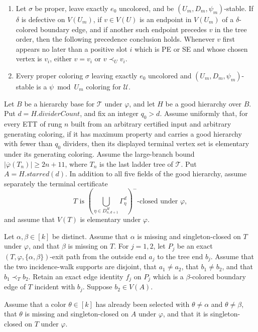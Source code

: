 \begin{lemma}
\begin{enumerate}
$(\gamma_m,\delta_m)$ incidence component through $v$ meets $V(U_m)$
exactly in $v$.
\item Let $\sigma$ be proper, leave exactly $e_0$ uncolored, and be
$(U_m,D_m,\psi_m)$-stable.  If $\delta$ is defective on $V(U_m)$, if
$v\in V(U)$ is an endpoint in $V(U_m)$ of a $\delta$-colored boundary
edge, and if another such endpoint precedes $v$ in the tree order, then
the following precedence conclusion holds.  Whenever $v$ first appears
no later than a positive slot $i$ which is PE or SE and whose chosen
vertex is $v_i$, either $v=v_i$ or $v\prec_U v_i$.
\item Every proper coloring $\sigma$ leaving exactly $e_0$ uncolored and
$(U_m,D_m,\psi_m)$-stable is a $\psi\bmod U_m$ coloring for
$\mathcal U$.
\end{enumerate}

Let $B$ be a hierarchy base for $\mathcal T$ under $\varphi$, and let $H$
be a good hierarchy over $B$.  Put $d=H.\mathit{dividerCount}$, and fix an
integer $q_0>d$.  Assume uniformly that, for every ETT of rung $n$ built
from an arbitrary certified input and arbitrary generating coloring, if it
has maximum property and carries a good hierarchy with fewer than $q_0$
dividers, then its displayed terminal vertex set is elementary under its
generating coloring.  Assume the large-branch bound
$|\overline\varphi(T_n)|\geq2n+11$, where $T_n$ is the last ladder tree of
$\mathcal T$.  Put $A=H.\mathit{starred}(d)$.  In addition to all five
fields of the good hierarchy, assume separately the terminal certificate
\[
 T\text{ is }
 \left(\bigcup_{\eta\in D^H_{n,d+1}}\Gamma^d_\eta\right)^-
 \text{-closed under }\varphi,
\]
and assume that $V(T)$ is elementary under $\varphi$.

Let $\alpha,\beta\in[k]$ be distinct.  Assume that $\alpha$ is missing and
singleton-closed on $T$ under $\varphi$, and that $\beta$ is missing on
$T$.  For $j=1,2$, let $P_j$ be an exact
$(T,\varphi,\{\alpha,\beta\})$-exit path from the outside end $a_j$ to the
tree end $b_j$.  Assume that the two incidence-walk supports are disjoint,
that $a_1\ne a_2$, that $b_1\ne b_2$, and that $b_1\prec_T b_2$.  Retain
an exact edge identity $f_j$ on $P_j$ which is a $\beta$-colored boundary
edge of $T$ incident with $b_j$.  Suppose $b_2\in V(A)$.

Assume that a color $\theta\in[k]$ has already been selected with
$\theta\ne\alpha$ and $\theta\ne\beta$, that $\theta$ is missing and
singleton-closed on $A$ under $\varphi$, and that it is singleton-closed
on $T$ under $\varphi$.


\end{lemma}
